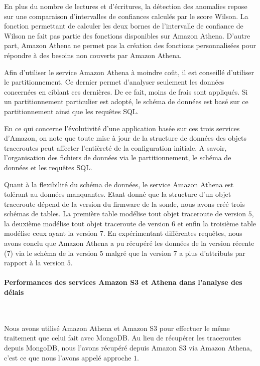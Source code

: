En plus du nombre de lectures et d'écritures, la détection des anomalies repose sur une comparaison d'intervalles de confiances calculés par le score  Wilson. La fonction permettant de calculer les deux bornes de l'intervalle de confiance de Wilson ne fait pas partie des fonctions disponibles sur Amazon Athena. D'autre part, Amazon Athena ne permet pas la création des fonctions personnalisées pour répondre à des besoins non couverts par Amazon Athena.



Afin d'utiliser le service Amazon Athena à moindre coût, il est conseillé d'utiliser le partitionnement. Ce dernier permet d'analyser seulement les données concernées en ciblant ces dernières. De ce fait, moins de frais sont appliqués. Si un partitionnement particulier est adopté, le schéma de données est basé sur ce partitionnement ainsi que les requêtes SQL.

En ce qui concerne l'évolutivité d'une application basée sur ces trois services d'Amazon, on note que toute mise à jour de la structure de données des objets traceroutes peut affecter l'entièreté de la configuration initiale. A savoir, l'organisation des fichiers de données via le partitionnement, le schéma de données et les requêtes SQL.

 Quant à la flexibilité du schéma de données, le service  Amazon Athena est tolérant au données manquantes. Etant donné que la structure d'un objet traceroute dépend de la version du firmware de la sonde, nous avons créé trois schémas de tables. La première table  modélise tout objet traceroute de  version $5$, la deuxième modélise tout objet traceroute de version $6$ et enfin la troisième table modélise ceux ayant la version $7$. En expérimentant différentes requêtes, nous avons conclu  que Amazon Athena a pu récupéré les données de la version récente ($7$) via le schéma de la version $5$ malgré que la version $7$ a plus d'attributs par rapport à la version $5$.
 
 
 




\paragraph{Performances des services Amazon S3 et Athena dans l'analyse des délais }~ \label{aws-perforsm}

Nous avons utilisé Amazon Athena et Amazon S3 pour effectuer le même traitement que celui fait avec MongoDB. Au lieu de récupérer les traceroutes depuis MongoDB, nous l'avons récupéré depuis Amazon S3 via Amazon Athena, c'est ce que nous l'avons appelé approche $1$. 

